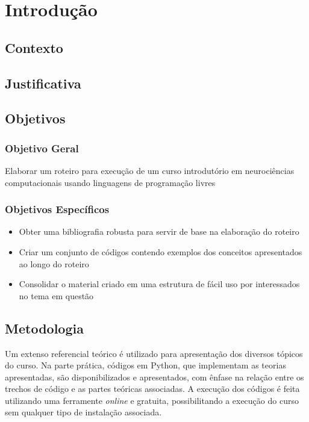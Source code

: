 \chapter{Introdução}\label{cap:introducao}
\section{Contexto}

\section{Justificativa}

\section{Objetivos}
\subsection{Objetivo Geral}
Elaborar um roteiro para execução de um curso introdutório em neurociências computacionais usando linguagens de programação livres

\subsection{Objetivos Específicos}
\begin{itemize}
\item Obter uma bibliografia robusta para servir de base na elaboração do roteiro
\item Criar um conjunto de códigos contendo exemplos dos conceitos apresentados ao longo do roteiro
\item Consolidar o material criado em uma estrutura de fácil uso por interessados no tema em questão
\end{itemize}

\section{Metodologia}
Um extenso referencial teórico é utilizado para apresentação dos diversos tópicos do curso. Na parte prática, códigos em Python, que implementam as teorias apresentadas, são disponibilizados e apresentados, com ênfase na relação entre os trechos de código e as partes teóricas associadas. A execução dos códigos é feita utilizando uma ferramente \textit{online} e gratuita, possibilitando a execução do curso sem qualquer tipo de instalação associada.

